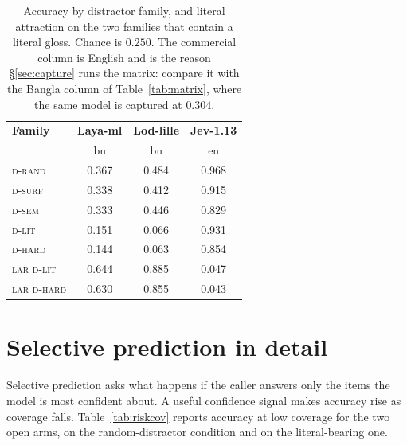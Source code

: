 \documentclass[11pt]{article}
\newcommand{\laya}[1]{\cellcolor{fLaya}#1}
\newcommand{\lod}[1]{\cellcolor{fLod}#1}
\newcommand{\jev}[1]{\cellcolor{fJev}#1}
\newcommand{\Drand}{\textsc{d-rand}}
\newcommand{\Dsurf}{\textsc{d-surf}}
\newcommand{\Dsem}{\textsc{d-sem}}
\newcommand{\Dlit}{\textsc{d-lit}}
\newcommand{\Dhard}{\textsc{d-hard}}
\newcommand{\LAR}{\textsc{lar}}
\begin{document}
\begin{table}[h]
\centering\small
\setlength{\tabcolsep}{4pt}
\begin{tabular}{lccc}
\toprule
\textbf{Family} & \laya{\textbf{Laya-ml}} & \lod{\textbf{Lod-lille}} & \jev{\textbf{Jev-1.13}} \\
 & \laya{bn} & \lod{bn} & \jev{en} \\
\midrule
\Drand & \laya{0.367} & \lod{0.484} & \jev{0.968} \\
\Dsurf & \laya{0.338} & \lod{0.412} & \jev{0.915} \\
\Dsem  & \laya{0.333} & \lod{0.446} & \jev{0.829} \\
\Dlit  & \laya{0.151} & \lod{0.066} & \jev{0.931} \\
\Dhard & \laya{0.144} & \lod{0.063} & \jev{0.854} \\
\midrule
\LAR{} \Dlit  & \laya{0.644} & \lod{0.885} & \jev{0.047} \\
\LAR{} \Dhard & \laya{0.630} & \lod{0.855} & \jev{0.043} \\
\bottomrule
\end{tabular}
\caption{Accuracy by distractor family, and literal attraction on the two
families that contain a literal gloss. Chance is $0.250$. The commercial column
is English and is the reason \S\ref{sec:capture} runs the matrix: compare it
with the Bangla column of Table~\ref{tab:matrix}, where the same model is
captured at $0.304$.}
\label{tab:fullladder}
\end{table}

\section{Selective prediction in detail}
\label{app:selective}

Selective prediction asks what happens if the caller answers only the items the
model is most confident about. A useful confidence signal makes accuracy rise as
coverage falls. Table~\ref{tab:riskcov} reports accuracy at low coverage for the
two open arms, on the random-distractor condition and on the literal-bearing
one.
\end{document}
